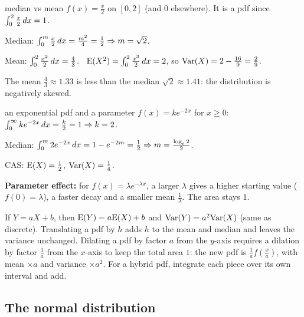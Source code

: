 \begin{cols}
\begin{example}{median vs mean \byhand}
$f(x)=\frac x2$ on $[0,2]$ (and $0$ elsewhere). It is a pdf since $\int_0^2\frac x2\,dx=1$.\par
Median: $\int_0^m\frac x2\,dx=\frac{m^2}{4}=\frac12\Rightarrow m=\sqrt2$.\par
Mean: $\int_0^2\frac{x^2}{2}\,dx=\frac43$. \ $\mathrm{E}(X^2)=\int_0^2\frac{x^3}{2}\,dx=2$, so $\mathrm{Var}(X)=2-\frac{16}{9}=\frac29$.\par
The mean $\frac43\approx1.33$ is less than the median $\sqrt2\approx1.41$: the distribution is negatively skewed.
\end{example}
\nextcol
\begin{example}{an exponential pdf and a parameter}
$f(x)=ke^{-2x}$ for $x\ge0$: $\int_0^\infty ke^{-2x}\,dx=\frac k2=1\Rightarrow k=2$.\par
Median: $\int_0^m2e^{-2x}\,dx=1-e^{-2m}=\frac12\Rightarrow m=\frac{\log_e2}{2}$.\par
CAS: $\mathrm{E}(X)=\frac12$, $\mathrm{Var}(X)=\frac14$.\par
\textbf{Parameter effect:} for $f(x)=\lambda e^{-\lambda x}$, a larger $\lambda$ gives a higher starting value ($f(0)=\lambda$), a faster decay and a smaller mean $\frac1\lambda$. The area stays $1$.
\end{example}
\end{cols}

\begin{tip}
If $Y=aX+b$, then $\mathrm{E}(Y)=a\mathrm{E}(X)+b$ and $\mathrm{Var}(Y)=a^2\mathrm{Var}(X)$ (same as discrete). Translating a pdf by $h$ adds $h$ to the mean and median and leaves the variance unchanged. Dilating a pdf by factor $a$ from the $y$-axis requires a dilation by factor $\frac1a$ from the $x$-axis to keep the total area $1$: the new pdf is $\frac1af\!\left(\frac xa\right)$, with mean $\times a$ and variance $\times a^2$. For a hybrid pdf, integrate each piece over its own interval and add.
\end{tip}

\subsection{The normal distribution}
\label{sec:normal}

